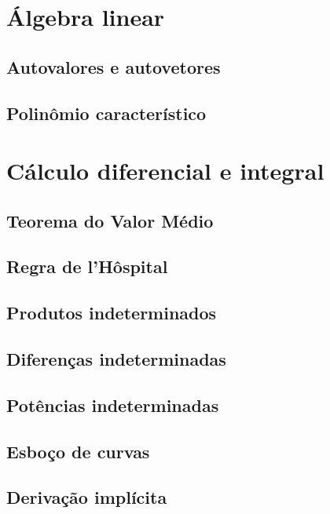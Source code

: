 \documentclass[12pt, a4paper]{article}
\begin{document}
	
	
	\section{Álgebra linear}
		\subsection{Autovalores e autovetores}
		
		
		\subsection{Polinômio característico}
		
	
	\section{Cálculo diferencial e integral}
		\subsection{Teorema do Valor Médio}
			
	
		\subsection{Regra de l'Hôspital}
		

		\subsection{Produtos indeterminados}
		
		
		\subsection{Diferenças indeterminadas}
		
	
		\subsection{Potências indeterminadas}
		
		
	
		\subsection{Esboço de curvas}
		
		
		\subsection{Derivação implícita}
		
		
	
\end{document}
